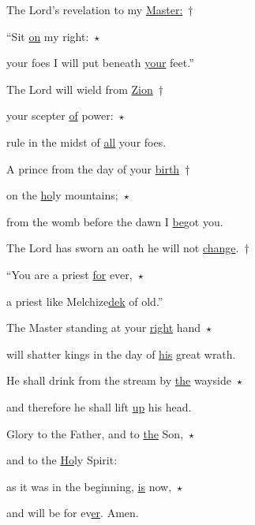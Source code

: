 
\noindent The Lord’s revelation to my \uline{Master:}~†~\nopagebreak

“Sit \uline{on} my right:~$\star$~\nopagebreak

your foes I will put beneath \uline{your} feet.”

\noindent The Lord will wield from \uline{Zion}~†~\nopagebreak

your scepter \uline{of} power:~$\star$~\nopagebreak

rule in the midst of \uline{all} your foes.

\noindent A prince from the day of your \uline{birth}~†~\nopagebreak

on the \uline{ho}ly mountains;~$\star$~\nopagebreak

from the womb before the dawn I \uline{be}got you.

\noindent The Lord has sworn an oath he will not \uline{change}.~†~\nopagebreak

“You are a priest \uline{for} ever,~$\star$~\nopagebreak

a priest like Melchize\uline{dek} of old.”

\noindent The Master standing at your \uline{right} hand~$\star$~\nopagebreak

will shatter kings in the day of \uline{his} great wrath.

\noindent He shall drink from the stream by \uline{the} wayside~$\star$~\nopagebreak

and therefore he shall lift \uline{up} his head.

\noindent Glory to the Father, and to \uline{the} Son,~$\star$~\nopagebreak

and to the \uline{Ho}ly Spirit:

\noindent as it was in the beginning, \uline{is} now,~$\star$~\nopagebreak

and will be for ev\uline{er}. Amen.
